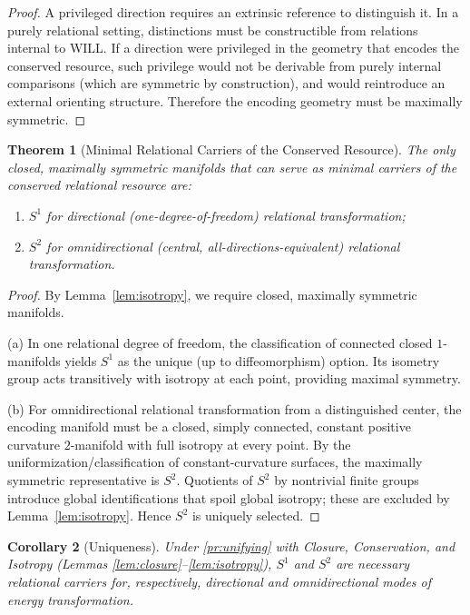 \documentclass[12pt, a4paper]{article}
\newtheorem{theorem}{Theorem}[section]
\newtheorem{corollary}[theorem]{Corollary}
\begin{document}
\begin{proof}
A privileged direction requires an extrinsic reference to distinguish it. In a purely relational setting, distinctions must be constructible from relations internal to WILL. If a direction were privileged in the geometry that encodes the conserved resource, such privilege would not be derivable from purely internal comparisons (which are symmetric by construction), and would reintroduce an external orienting structure. Therefore the encoding geometry must be maximally symmetric.  
\end{proof}


\begin{theorem}[Minimal Relational Carriers of the Conserved Resource]
\label{thm:carriers}
The only closed, maximally symmetric manifolds that can serve as minimal carriers of the conserved relational resource are:
    \begin{enumerate}[label=(\alph*)]
        \item \(S^1\) for \emph{directional} (one-degree-of-freedom) relational transformation;
        \item \(S^2\) for \emph{omnidirectional} (central, all-directions-equivalent) relational transformation.
    \end{enumerate}
\end{theorem}

\begin{proof}
By Lemma~\ref{lem:isotropy}, we require closed, maximally symmetric manifolds. 

(a) In one relational degree of freedom, the classification of connected closed $1$-manifolds yields \(S^1\) as the unique (up to diffeomorphism) option. Its isometry group acts transitively with isotropy at each point, providing maximal symmetry.

(b) For omnidirectional relational transformation from a distinguished center, the encoding manifold must be a closed, simply connected, constant positive curvature $2$-manifold with full isotropy at every point. By the uniformization/classification of constant-curvature surfaces, the maximally symmetric representative is \(S^2\). Quotients of \(S^2\) by nontrivial finite groups introduce global identifications that spoil global isotropy; these are excluded by Lemma~\ref{lem:isotropy}. Hence \(S^2\) is uniquely selected.  
\end{proof}

\begin{corollary}[Uniqueness]
\label{cor:uniqueness}
Under \ref{pr:unifying} with Closure, Conservation, and Isotropy (Lemmas \ref{lem:closure}--\ref{lem:isotropy}), \(S^1\) and \(S^2\) are \emph{necessary} relational carriers for, respectively, directional and omnidirectional modes of energy transformation.
\end{corollary}
\end{document}
